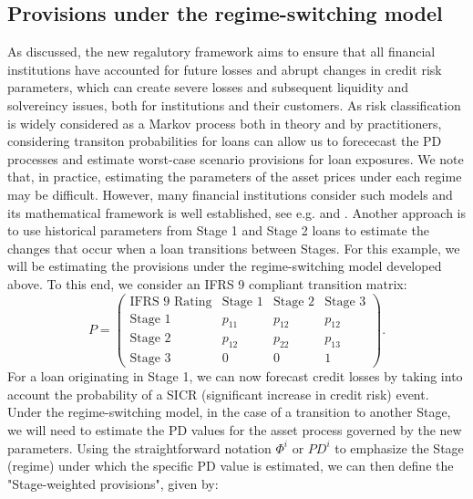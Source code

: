 \documentclass[11pt,reqno]{article}
\theoremstyle{definition}
\begin{document}
\subsection{Provisions under the regime-switching model}
\par As discussed, the new regalutory framework aims to ensure that all financial institutions have accounted for future losses and abrupt changes in credit risk parameters, which can create severe losses and subsequent liquidity and solvereincy issues, both for institutions and their customers. As risk classification is widely considered as a Markov process both in theory and by practitioners, considering transiton probabilities for loans can allow us to forececast the PD processes and estimate worst-case scenario provisions for loan exposures. We note that, in practice, estimating the parameters of the asset prices under each regime may be difficult. However, many financial institutions consider such models and its mathematical framework is well established, see e.g. \cite{chatterjee2015centre} and \cite{bruche2005estimating}. Another approach is to use historical parameters from Stage 1 and Stage 2 loans to estimate the changes that occur when a loan transitions between Stages. For this example, we will be estimating the provisions under the regime-switching model developed above. To this end, we consider an IFRS 9 compliant transition matrix:
$$
P=\left(  \begin{array}{c|ccc}
\text{IFRS 9 Rating} & \text{Stage 1} & \text{Stage 2} & \text{Stage 3}\\
\hline
\text{Stage 1} & p_{11} & p_{12} & p_{12}\\
\text{Stage 2} & p_{12} & p_{22} & p_{13}  \\
\text{Stage 3} & 0 & 0 &1
\end{array}
\right).
$$
For a loan originating in Stage 1, we can now forecast credit losses by taking into account the probability of a SICR (significant increase in credit risk) event. Under the regime-switching model, in the case of a transition to another Stage, we will need to estimate the PD values for the asset process governed by the new parameters. Using the straightforward notation $\Phi^i$ or $PD^i$ to emphasize the Stage (regime) under which the specific PD value is estimated, we can then define the "Stage-weighted provisions", given by:
\end{document}
